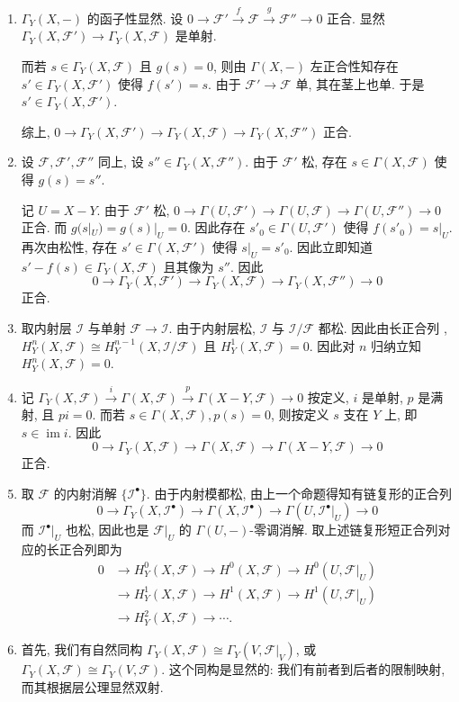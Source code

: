 \documentclass{article}
\theoremstyle{exercise}
\theoremstyle{plain}
\theoremstyle{remark}
\newenvironment{proofc}{\proof}{\endproof}
\def\sF{\mathscr{F}}
\def\sI{\mathscr{I}}
\def\im{\operatorname{im}}
\begin{document}
\begin{proofc} \hfill
  \begin{enumerate}[label=(\arabic*)]
    \item $\Gamma_Y(X, -)$ 的函子性显然.
          设 $0 \to \sF' \xrightarrow{f} \sF \xrightarrow{g} \sF'' \to 0$ 正合.
          显然 $\Gamma_Y(X, \sF') \to \Gamma_Y(X, \sF)$ 是单射.

          而若 $s \in \Gamma_Y(X, \sF)$ 且 $g(s) = 0$,
          则由 $\Gamma(X, -)$ 左正合性知存在 $s' \in \Gamma_Y(X, \sF')$ 使得 $f(s') = s$.
          由于 $\sF' \to \sF$ 单, 其在茎上也单. 于是 $s' \in \Gamma_Y(X, \sF')$.

          综上, $0 \to \Gamma_Y(X, \sF') \to \Gamma_Y(X, \sF) \to \Gamma_Y(X, \sF'')$
          正合.
    \item 设 $\sF, \sF', \sF''$ 同上, 设  $s'' \in \Gamma_Y(X, \sF'')$.
          由于 $\sF'$ 松, 存在 $s \in \Gamma(X, \sF)$ 使得 $g(s) = s''$.

          记  $U = X - Y$. 由于 $\sF'$ 松,
          $0 \to \Gamma(U, \sF') \to \Gamma(U, \sF) \to \Gamma(U, \sF'') \to 0$ 正合.
          而 $g(s|_U) = g(s)|_U = 0$. 因此存在  $s'_0 \in \Gamma(U, \sF')$
          使得 $f(s'_0) = s|_U$. 再次由松性, 存在 $s' \in \Gamma(X, \sF')$
          使得 $s|_U = s'_0$. 因此立即知道 $s' - f(s) \in \Gamma_Y(X, \sF)$
          且其像为 $s''$. 因此
          \[ 0 \to \Gamma_Y(X, \sF') \to \Gamma_Y(X, \sF) \to \Gamma_Y(X, \sF'') \to 0 \]
          正合.
    \item 取内射层 $\sI$ 与单射 $\sF \to \sI$. 由于内射层松, $\sI$ 与 $\sI / \sF$ 都松.
          因此由长正合列 , $H_Y^n(X, \sF) \cong H_Y^{n-1}(X, \sI / \sF)$
          且 $H_Y^1(X, \sF) = 0$.
          因此对 $n$ 归纳立知 $H_Y^n(X, \sF) = 0$.
    \item 记
          $\Gamma_Y(X, \sF) \xrightarrow{i} \Gamma(X, \sF)
          \xrightarrow{p} \Gamma(X - Y, \sF) \to 0$
          按定义, $i$ 是单射, $p$ 是满射, 且 $pi = 0$.
          而若 $s \in \Gamma(X, \sF), p(s) = 0$, 则按定义 $s$ 支在 $Y$ 上,
          即 $s \in \im i$. 因此
          \[ 0 \to \Gamma_Y(X, \sF) \to \Gamma(X, \sF) \to \Gamma(X - Y, \sF) \to 0 \]
          正合.
    \item 取 $\sF$ 的内射消解 $\{\sI^\bullet\}$.
          由于内射模都松, 由上一个命题得知有链复形的正合列
          \[
          0 \to \Gamma_Y(X, \sI^\bullet)
          \to \Gamma(X, \sI^\bullet)
          \to \Gamma(U, \sI^\bullet|_U) \to 0
          \]
          而 $\sI^\bullet|_U$ 也松, 因此也是 $\sF|_U$ 的 $\Gamma(U, -)$-零调消解.
          取上述链复形短正合列对应的长正合列即为
          \begin{align*}
            0 & \to H_Y^0(X, \sF) \to H^0(X, \sF) \to H^0(U, \sF|_U) \\
              & \to H_Y^1(X, \sF) \to H^1(X, \sF) \to H^1(U, \sF|_U) \\
              & \to H_Y^2(X, \sF) \to \cdots.
          \end{align*}
    \item 首先, 我们有自然同构 $\Gamma_Y(X, \sF) \cong \Gamma_Y(V, \sF|_V)$,
          或 $\Gamma_Y(X, \sF) \cong \Gamma_Y(V, \sF)$.
          这个同构是显然的: 我们有前者到后者的限制映射, 而其根据层公理显然双射.


\end{enumerate}
\end{proofc}
\end{document}
